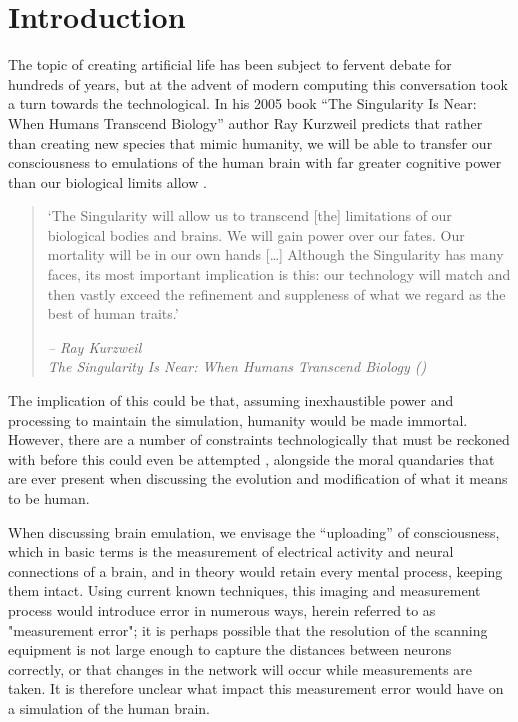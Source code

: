 \chapter{Introduction}


The topic of creating artificial life has been subject to fervent debate for
hundreds of years, but at the advent of modern computing this conversation took
a turn towards the technological. In his 2005 book “The Singularity Is Near:
When Humans Transcend Biology” author Ray Kurzweil predicts that rather than
creating new species that mimic humanity, we will be able to transfer our
consciousness to emulations of the human brain with far greater cognitive power
than our biological limits allow \autocite{kurzweil_singularity_2006}.

\begin{quote}
      `The Singularity will allow us to transcend [the] limitations of our
      biological bodies and brains. We will gain power over our fates. Our
      mortality will be in our own hands [\ldots] Although the Singularity has
      many faces, its most important implication is this: our technology will
      match and then vastly exceed the refinement and suppleness of what we
      regard as the best of human traits.'
\begin{flushright}
      \textit{-- Ray Kurzweil \\ The Singularity Is Near: When Humans Transcend
      Biology (\citeyear{kurzweil_singularity_2006})}
  \end{flushright}
\end{quote}  

The implication of this could be that, assuming inexhaustible power and
processing to maintain the simulation, humanity would be made immortal. However,
there are a number of constraints technologically that must be reckoned with
before this could even be attempted \parencite{bostrom_whole_2008}, alongside
the moral quandaries that are ever present when discussing the evolution and
modification of what it means to be human.

When discussing brain emulation, we envisage the “uploading” of consciousness,
which in basic terms is the measurement of electrical activity and neural
connections of a brain, and in theory would retain every mental process, keeping
them intact. Using current known techniques, this imaging and measurement
process would introduce error in numerous ways, herein referred to as
"measurement error"; it is perhaps possible that the resolution of the scanning
equipment is not large enough to capture the distances between neurons
correctly, or that changes in the network will occur while measurements are
taken. It is therefore unclear what impact this measurement error would have on
a simulation of the human brain.

